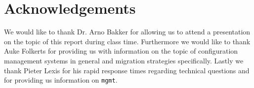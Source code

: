 \thispagestyle{acknowledgements}
\section*{Acknowledgements}\label{sec:acknowledgements}
We would like to thank Dr. Arno Bakker for allowing us to attend a presentation on the topic of this report during class time. Furthermore we would like to thank Auke Folkerts for providing us with information on the topic of configuration management systems in general and migration strategies specifically. Lastly we thank Pieter Lexis for his rapid response times regarding technical questions and for providing us information on \texttt{mgmt}.
